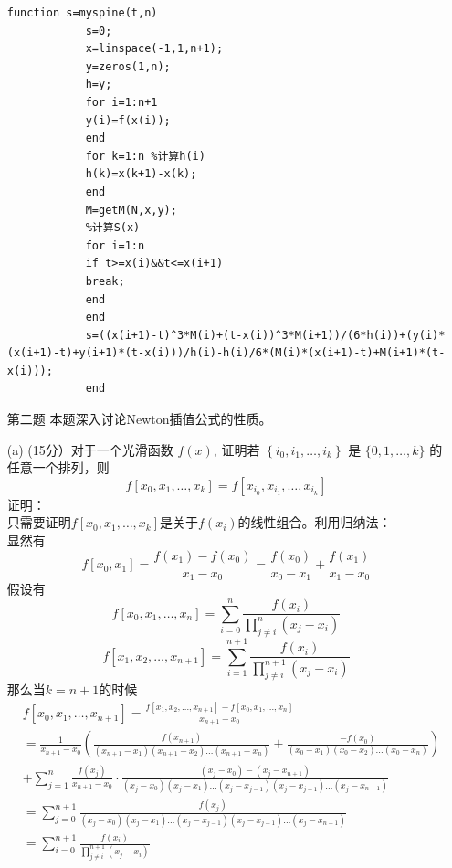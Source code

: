 \documentclass[12pt,a4paper,utf8]{ctexart}
\begin{document}
\begin{enumerate}
\begin{lstlisting}[breaklines,frame=single]
			function s=myspine(t,n)
			s=0;
			x=linspace(-1,1,n+1);
			y=zeros(1,n);
			h=y;
			for i=1:n+1
			y(i)=f(x(i));
			end
			for k=1:n %计算h(i)
			h(k)=x(k+1)-x(k);
			end
			M=getM(N,x,y);
			%计算S(x)
			for i=1:n
			if t>=x(i)&&t<=x(i+1)
			break;
			end
			end
			s=((x(i+1)-t)^3*M(i)+(t-x(i))^3*M(i+1))/(6*h(i))+(y(i)*(x(i+1)-t)+y(i+1)*(t-x(i)))/h(i)-h(i)/6*(M(i)*(x(i+1)-t)+M(i+1)*(t-x(i)));
			end
		\end{lstlisting}
		\item[第二题] 本题深入讨论Newton插值公式的性质。
		\item[(a)](15分）对于一个光滑函数 $f(x)$, 证明若 $\left\{i_{0}, i_{1}, \ldots, i_{k}\right\}$ 是 $\{0,1, \ldots, k\}$ 的任意一个排列，则
		$$
		f\left[x_{0}, x_{1}, \ldots, x_{k}\right]=f\left[x_{i_{0}}, x_{i_{1}}, \ldots, x_{i_{k}}\right]
		$$
		证明：\\
		只需要证明$f\left[x_{0}, x_{1}, \ldots, x_{k}\right]$是关于$f(x_{i})$的线性组合。利用归纳法：\\
		显然有$$
		f\left[x_{0}, x_{1}\right]=\frac{f\left(x_{1}\right)-f\left(x_{0}\right)}{x_{1}-x_{0}}=\frac{f\left(x_{0}\right)}{x_{0}-x_{1}}+\frac{f\left(x_{1}\right)}{x_{1}-x_{0}}
		$$
		假设有$$
		f\left[x_{0}, x_{1}, \ldots, x_{n}\right]=\sum_{i=0}^{n}\frac{f(x_{i})}{\prod_{j\neq i}^{n}{(x_{j}-x_{i})}}$$
		$$
		f\left[x_{1}, x_{2}, \ldots, x_{n+1}\right]=\sum_{i=1}^{n+1}\frac{f(x_{i})}{\prod_{j\neq i}^{n+1}{(x_{j}-x_{i})}}
		$$
		那么当$k=n+1$的时候
		\begin{equation}
			\begin{aligned}
				&f\left[x_{0}, x_{1}, \ldots, x_{n+1}\right]=\frac{f\left[x_{1}, x_{2}, \ldots, x_{n+1}\right]-f\left[x_{0}, x_{1}, \ldots, x_{n}\right]}{x_{n+1}-x_{0}}\\
				&=\frac{1}{x_{n+1}-x_{0}}\left(\frac{f\left(x_{n+1}\right)}{\left(x_{n+1}-x_{1}\right)\left(x_{n+1}-x_{2}\right) \ldots\left(x_{n+1}-x_{n}\right)}+\frac{-f\left(x_{0}\right)}{\left(x_{0}-x_{1}\right)\left(x_{0}-x_{2}\right) \ldots\left(x_{0}-x_{n}\right)}\right)\\
				&+\sum_{j=1}^{n} \frac{f\left(x_{j}\right)}{x_{n+1}-x_{0}} \cdot \frac{\left(x_{j}-x_{0}\right)-\left(x_{j}-x_{n+1}\right)}{\left(x_{j}-x_{0}\right)\left(x_{j}-x_{1}\right) \ldots\left(x_{j}-x_{j-1}\right)\left(x_{j}-x_{j+1}\right) \ldots\left(x_{j}-x_{n+1}\right)}\\
				&=\sum_{j=0}^{n+1} \frac{f\left(x_{j}\right)}{\left(x_{j}-x_{0}\right)\left(x_{j}-x_{1}\right) \ldots\left(x_{j}-x_{j-1}\right)\left(x_{j}-x_{j+1}\right) \ldots\left(x_{j}-x_{n+1}\right)}\\
				&=\sum_{i=0}^{n+1}\frac{f(x_{i})}{\prod_{j\neq i}^{n+1}{(x_{j}-x_{i})}}
			\end{aligned}
		\end{equation}
		

\end{enumerate}
\end{document}
